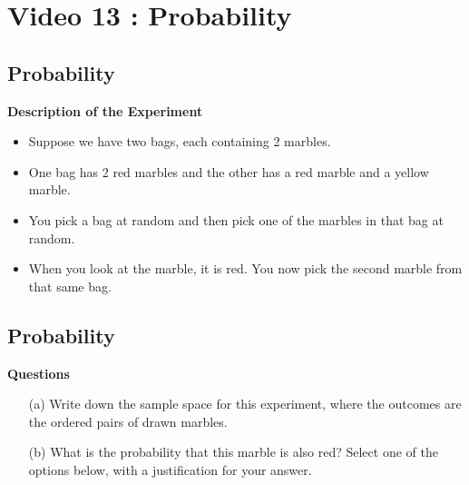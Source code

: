 
\section{Video 13 : Probability}

\subsection{Probability}

\textbf{Description of the Experiment}
\begin{itemize}
\item Suppose we have two bags, each containing 2 marbles. 
\item One bag has 2 red marbles and
the other has a red marble and a yellow marble. 
\item You pick a bag at random and then pick
one of the marbles in that bag at random. 
\item When you look at the marble, it is red. 
You now pick the second marble from that same bag.
\end{itemize} 



\subsection{Probability}

\textbf{Questions}
\begin{itemize}
\item[(a)] Write down the sample space for this experiment, where the outcomes are the ordered pairs of drawn marbles.
\item[(b)] What is the probability that this marble
is also red? Select one of the options below, with a justification for your answer.
\end{itemize}




